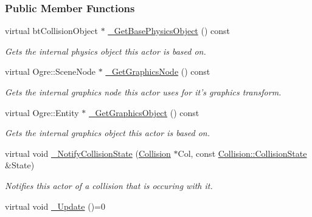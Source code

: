 \subsubsection*{Public Member Functions}
\begin{DoxyCompactItemize}
\item 
virtual btCollisionObject $\ast$ \hyperlink{classMezzanine_1_1ActorBase_a6f8b107522665d5ecee1f10f4a49464d}{\_\-GetBasePhysicsObject} () const 
\begin{DoxyCompactList}\small\item\em Gets the internal physics object this actor is based on. \item\end{DoxyCompactList}\item 
virtual Ogre::SceneNode $\ast$ \hyperlink{classMezzanine_1_1ActorBase_a060b9a1c42de39c0bcaa9535a5606ffa}{\_\-GetGraphicsNode} () const 
\begin{DoxyCompactList}\small\item\em Gets the internal graphics node this actor uses for it's graphics transform. \item\end{DoxyCompactList}\item 
virtual Ogre::Entity $\ast$ \hyperlink{classMezzanine_1_1ActorBase_ae4a2cc51ec188f7cfbab462f2cd76f8f}{\_\-GetGraphicsObject} () const 
\begin{DoxyCompactList}\small\item\em Gets the internal graphics object this actor is based on. \item\end{DoxyCompactList}\item 
virtual void \hyperlink{classMezzanine_1_1ActorBase_a5426eb2e8abd1d64a8880adad8e5f73c}{\_\-NotifyCollisionState} (\hyperlink{classMezzanine_1_1Collision}{Collision} $\ast$Col, const \hyperlink{classMezzanine_1_1Collision_a24094c597061743dcd571f36077f4d19}{Collision::CollisionState} \&State)
\begin{DoxyCompactList}\small\item\em Notifies this actor of a collision that is occuring with it. \item\end{DoxyCompactList}\item 
\hypertarget{classMezzanine_1_1ActorBase_a8f5a36a6981f1249dbabab318531afd0}{
virtual void \hyperlink{classMezzanine_1_1ActorBase_a8f5a36a6981f1249dbabab318531afd0}{\_\-Update} ()=0}
\label{classMezzanine_1_1ActorBase_a8f5a36a6981f1249dbabab318531afd0}


\end{DoxyCompactItemize}
